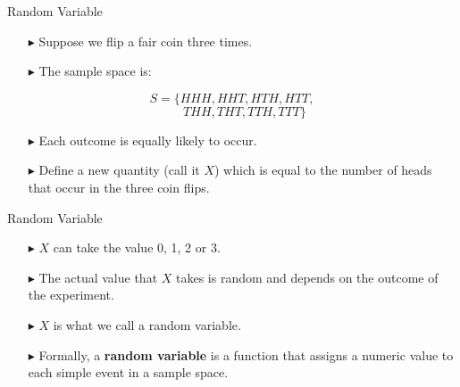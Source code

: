 \documentclass[12pt]{beamer}
\begin{document}
\begin{frame}{Random Variable}
	
\begin{itemize}
	\item[\color{blue}$\blacktriangleright$] Suppose we flip a fair coin three times.
	\item[\color{blue}$\blacktriangleright$] The sample space is:
\end{itemize}

\[
S = \{HHH, HHT, HTH, HTT,
\]
\[
\quad\quad THH, THT, TTH, TTT\}
\]

\begin{itemize}
	\item[\color{blue}$\blacktriangleright$] Each outcome is equally likely to occur.
	\item[\color{blue}$\blacktriangleright$] Define a new quantity (call it $X$) which is equal to the number of heads that occur in the three coin flips.
\end{itemize}
	
\end{frame}

\begin{frame}{Random Variable}
\begin{itemize}
\item[\color{blue}$\blacktriangleright$] $X$ can take the value 0, 1, 2 or 3.
\item[\color{blue}$\blacktriangleright$] The actual value that $X$ takes is random and depends on the outcome of the experiment.
\item[\color{blue}$\blacktriangleright$] $X$ is what we call a random variable.
\item[\color{blue}$\blacktriangleright$] Formally, a {\bf random variable} is a function that assigns a numeric value to each simple event in a sample space.
\end{itemize}

	
\end{frame}
\end{document}
